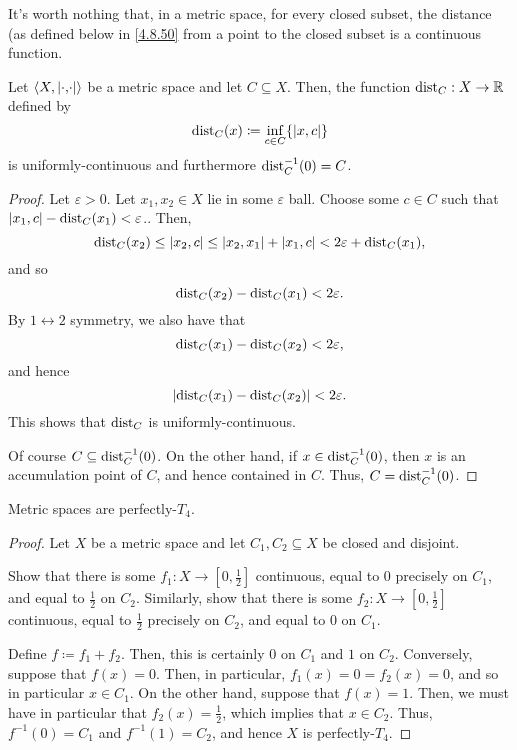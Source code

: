 It's worth nothing that, in a metric space, for every closed subset, the distance (as defined below in \eqref{4.8.50} from a point to the closed subset is a continuous function.
\begin{prp}\label{prp4.8.49}
Let $\coord{X,\metric}$ be a metric space and let $C\subseteq X$.  Then, the function $\operatorname{dist} _C:X\rightarrow \mathbb{R}$ defined by
\begin{equation}\label{4.8.50}
\dist _C(x)\coloneqq \inf _{c\in C}\{ \metric[x][c]\} 
\end{equation}
is uniformly-continuous and furthermore $\operatorname{dist} _C^{-1}(0)=C$.
\begin{proof}
Let $\varepsilon >0$.  Let $x_1,x_2\in X$ lie in some $\varepsilon$ ball.  Choose some $c\in C$ such that $\metric[x_1][c]-\dist_C(x_1)<\varepsilon$..  Then,
\begin{equation}
\dist _C(x_2)\leq \metric[x_2][c]\leq \metric[x_2][x_1]+\metric[x_1][c]<2\varepsilon +\dist _C(x_1),
\end{equation}
and so
\begin{equation}
\operatorname{dist} _C(x_2)-\operatorname{dist} _C(x_1)<2\varepsilon .
\end{equation}
By $1\leftrightarrow 2$ symmetry, we also have that
\begin{equation}
\operatorname{dist} _C(x_1)-\operatorname{dist} _C(x_2)<2\varepsilon ,
\end{equation}
and hence
\begin{equation}
\lvert\operatorname{dist} _C(x_1)-\operatorname{dist} _C(x_2)\rvert<2\varepsilon .
\end{equation}
This shows that $\operatorname{dist} _C$ is uniformly-continuous.

Of course $C\subseteq \operatorname{dist} _C^{-1}(0)$.  On the other hand, if $x\in \operatorname{dist} _C^{-1}(0)$, then $x$ is an accumulation point of $C$, and hence contained in $C$.  Thus, $C=\operatorname{dist} _C^{-1}(0)$.
\end{proof}
\end{prp}
\begin{prp}\label{prp5.4.13}
Metric spaces are perfectly-$T_4$.
\begin{proof}
Let $X$ be a metric space and let $C_1,C_2\subseteq X$ be closed and disjoint.
\begin{exr}
Show that there is some $f_1:X\rightarrow [0,\frac{1}{2}]$ continuous, equal to $0$ precisely on $C_1$, and equal to $\frac{1}{2}$ on $C_2$.  Similarly, show that there is some $f_2:X\rightarrow [0,\frac{1}{2}]$ continuous, equal to $\frac{1}{2}$ precisely on $C_2$, and equal to $0$ on $C_1$.
\end{exr}
Define $f\coloneqq f_1+f_2$.  Then, this is certainly $0$ on $C_1$ and $1$ on $C_2$.  Conversely, suppose that $f(x)=0$.  Then, in particular, $f_1(x)=0=f_2(x)=0$, and so in particular $x\in C_1$.  On the other hand, suppose that $f(x)=1$.  Then, we must have in particular that $f_2(x)=\frac{1}{2}$, which implies that $x\in C_2$.  Thus, $f^{-1}(0)=C_1$ and $f^{-1}(1)=C_2$, and hence $X$ is perfectly-$T_4$.
\end{proof}
\end{prp}


